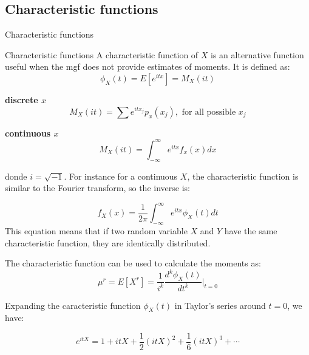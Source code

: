 \documentclass[8pt]{beamer}
\renewcommand{\emph}[1]{\textcolor{myorange}{#1}}
\begin{document}
\subsection{Characteristic functions} %
\begin{frame}{Characteristic functions}
    \begin{block}{Characteristic functions}
        A \alert{characteristic function} of $X$ is an alternative function useful when the \emph{mgf} does not provide estimates of moments. It is defined as:
        \[
            \phi_X (t) = E[e^{itx}] = M_X (it)
        \]
\begin{minipage}[t]{0.44\textwidth}
\centering
\textbf{discrete $x$}
\[
    M_X (it) = \sum e^{it x_j} p_x (x_j), \text{ for all possible $x_j$}
\]
\end{minipage}
\hfill
\begin{minipage}[t]{0.44\textwidth}
\centering
\textbf{continuous $x$}
\[
    M_X (it) = \int_{-\infty}^{\infty} e^{it x} f_x (x) dx
\]

\end{minipage}

donde $i = \sqrt{-1}$. For instance for a continuous $X$, the characteristic function is similar to the \emph{Fourier transform}, so the inverse is:

\[
    f_X (x) = \frac{1}{2 \pi} \int_{-\infty}^{\infty} e^{itx}   \phi_X (t) dt
\]
This equation means that if two random variable $X$ and $Y$ have the same characteristic function, they are identically distributed.

The \emph{characteristic function} can be used to calculate the moments as:
\[
    \mu^r = E [X^r] = \frac{1}{i^k} \frac{d^k \phi_X (t)}{dt^k} \Big|_{t=0}
\]

Expanding the caracteristic function $\phi_X (t)$ in \emph{Taylor's series} around $t=0$, we have:

\[
    e^{itX} = 1 + itX + \frac{1}{2} (itX)^2 + \frac{1}{6} (itX)^3 + \cdots  
\]
    \end{block}
\end{frame}
\end{document}
